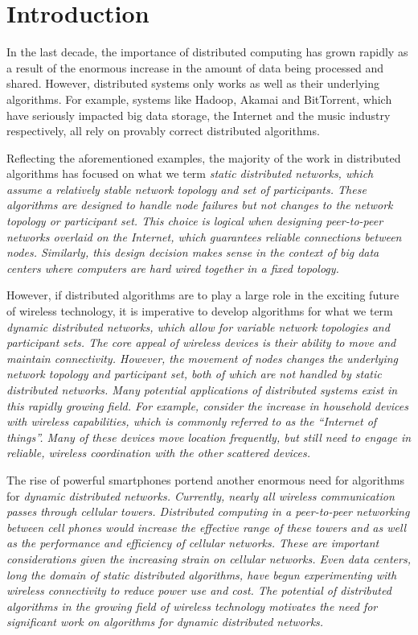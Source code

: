 \documentclass[english]{article}
\begin{document}
\section{Introduction}

In the last decade, the importance of distributed computing has grown rapidly as a result of the enormous increase in the amount of data being processed and shared. However, distributed systems only works as well as their underlying algorithms. For example, systems like Hadoop, Akamai and BitTorrent, which have seriously impacted big data storage, the Internet and the music industry respectively, all rely on provably correct distributed algorithms. 

Reflecting the aforementioned examples, the majority of the work in distributed algorithms has focused on what we term \em static distributed networks\em, which assume a relatively stable network topology and set of participants. These algorithms are designed to handle node failures but not changes to the network topology or participant set. This choice is logical when designing peer-to-peer networks overlaid on the Internet, which guarantees reliable connections between nodes. Similarly, this design decision makes sense in the context of big data centers where computers are hard wired together in a fixed topology. 

However, if distributed algorithms are to play a large role in the exciting future of wireless technology, it is imperative to develop algorithms for what we term \em dynamic distributed networks\em, which allow for variable network topologies and participant sets. The core appeal of wireless devices is their ability to move and maintain connectivity. However, the movement of nodes changes the underlying network topology and participant set, both of which are not handled by \em static distributed networks\em. Many potential applications of distributed systems exist in this rapidly growing field. For example, consider the increase in household devices with wireless capabilities, which is commonly referred to as the ``Internet of things''. Many of these devices move location frequently, but still need to engage in reliable, wireless coordination with the other scattered devices.

The rise of powerful smartphones portend another enormous need for algorithms for \em dynamic distributed networks\em. Currently, nearly all wireless communication passes through cellular towers. Distributed computing in a peer-to-peer networking between cell phones would increase the effective range of these towers and as well as the performance and efficiency of cellular networks. These are important considerations given the increasing strain on cellular networks. Even data centers, long the domain of static distributed algorithms, have begun experimenting with wireless connectivity to reduce power use and cost. The potential of distributed algorithms in the growing field of wireless technology motivates the need for significant work on algorithms for \em dynamic distributed networks\em.
\end{document}
